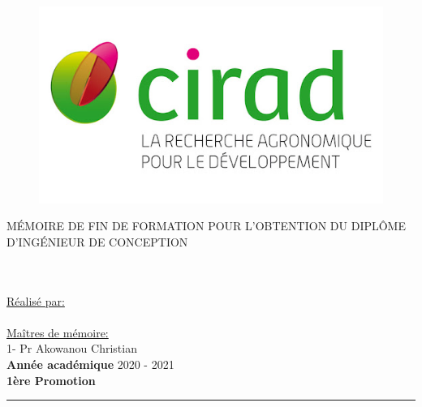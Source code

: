 \begin{titlepage}
\begin{center}
\begin{figure}[!htb]
\begin{minipage}{0.50\textwidth}
				
			\end{minipage}
			\hfill
			\begin{minipage}{0.22\textwidth}%
				\includegraphics[width=\linewidth]{Figures/cirad}
			\end{minipage}
		\end{figure}
		{\scshape\LARGE \univname\par}\vspace{1cm} %
		{\scshape\large MÉMOIRE DE FIN DE FORMATION POUR L’OBTENTION DU DIPLÔME D’INGÉNIEUR DE CONCEPTION}\\[0.2cm] %
		
		\HRule \\[0.4cm] %
		{\Large \bfseries \ttitle\par}\vspace{0.2cm} %
		\HRule \\[1.5cm] %
		
		\large \underline{Réalisé par:}\\[0.3cm]{\textbf{\Large \authorname}} \\
		\vspace{0.5cm}
		\large \underline{Maîtres de mémoire:} \\[0.3cm]{\textbf{\Large \supname}} %
		1- Pr Akowanou Christian
		\\[2cm]
		
		\textbf{\Large Année académique} 2020 - 2021\\[0.4cm]
		\vfill
		\textbf{\Large 1ère Promotion}\\[0.7cm]
		\hrule height 0.1cm %
		
	\end{center}
\end{titlepage}